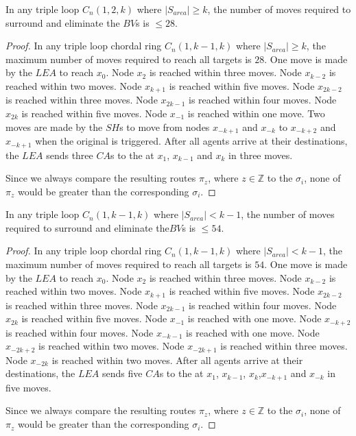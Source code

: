  
 \begin{theorem}
In any triple loop   $C_n(1,2,k)$ where $\left\vert{S_{area}}\right\vert \ge k$,  the number of moves required to surround and eliminate the $BV$s is $\leq28$.
\end{theorem}
 \begin{proof}
In any triple loop chordal ring $C_n(1,k-1,k)$ where $\left\vert{S_{area}}\right\vert \ge k$, the maximum number of moves required to reach all targets is $28$. 
One move is made by the $LEA$ to reach $x_0$.
 Node $x_{2}$ is reached within three moves.
Node $x_{k-2}$ is reached within two moves.
Node $x_{k+1}$ is reached within five moves.
Node $x_{2k-2}$ is reached within three moves.
Node $x_{2k-1}$ is reached within four moves.
Node $x_{2k}$ is reached within five moves.
 Node $x_{-1}$ is reached within one move.
 Two moves are made by the $SH$s to move from  nodes $x_{-k+1}$ and $x_{-k}$ to $x_{-k+2}$ and $x_{-k+1}$  when the original \bv is triggered.
After all agents arrive at their destinations, the $LEA$ sends three $CA$s to the \bvs at $x_{1}$, $x_{k-1}$ and $x_{k}$ in three moves.

Since we always compare the resulting routes $\pi_z$, where $z \in \mathbb{Z}$  to the  $\sigma_i$, none of $\pi_z$ would be greater than the corresponding $\sigma_i$. 
\end{proof}

\begin{theorem}
In any triple loop   $C_n(1,k-1,k)$ where $\left\vert{S_{area}}\right\vert < k-1$,  the number of moves required to surround and eliminate the$BV$s  is $\leq54$.
\end{theorem}
 \begin{proof}
In any triple loop chordal ring $C_n(1,k-1,k)$ where $\left\vert{S_{area}}\right\vert <k-1$, the maximum number of moves required to reach all targets is $54$. One move is made by the $LEA$ to reach $x_0$.
 Node $x_{2}$ is reached within three moves.
 Node $x_{k-2}$ is reached within two moves.
Node $x_{k+1}$ is reached within five moves.
 Node $x_{2k-2}$ is reached within three moves.
Node $x_{2k-1}$ is reached within four moves.
 Node $x_{2k}$ is reached within five moves.
 Node $x_{-1}$ is reached with one move.
Node $x_{-k+2}$ is reached within four moves.
 Node $x_{-k-1}$ is reached with one move.
 Node $x_{-2k+2}$ is reached within two moves.
Node $x_{-2k+1}$ is reached within three moves.
 Node $x_{-2k}$ is reached within two moves.
 After all agents arrive at their destinations, the $LEA$ sends five $CA$s to the \bvs at $x_{1}$, $x_{k-1}$, $x_{k}$,$x_{-k+1}$ and $x_{-k}$ in five moves.

Since we always compare the resulting routes $\pi_z$, where $z \in \mathbb{Z}$  to the  $\sigma_i$, none of $\pi_z$ would be greater than the corresponding $\sigma_i$. 
\end{proof}

